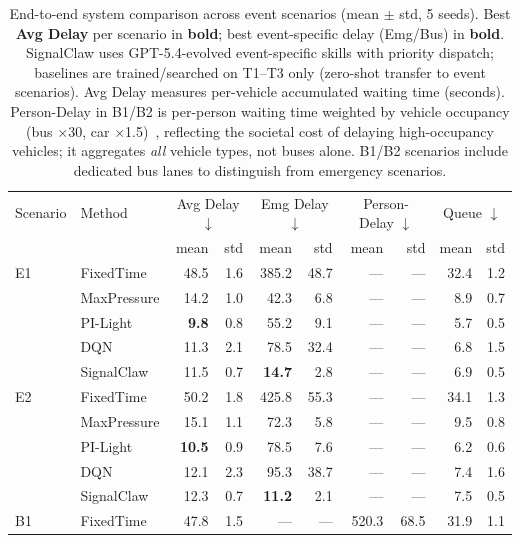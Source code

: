 \begin{table}[t]
\centering
\caption{End-to-end system comparison across event scenarios (mean $\pm$ std, 5 seeds). Best \textbf{Avg Delay} per scenario in \textbf{bold}; best event-specific delay (Emg/Bus) in \textbf{bold}. SignalClaw uses GPT-5.4-evolved event-specific skills with priority dispatch; baselines are trained/searched on T1--T3 only (zero-shot transfer to event scenarios). Avg Delay measures per-vehicle accumulated waiting time (seconds). Person-Delay in B1/B2 is per-person waiting time weighted by vehicle occupancy (bus $\times$30, car $\times$1.5)~\citep{christofa2013tsp}, reflecting the societal cost of delaying high-occupancy vehicles; it aggregates \emph{all} vehicle types, not buses alone. B1/B2 scenarios include dedicated bus lanes to distinguish from emergency scenarios.}
\label{tab:event_results}
\footnotesize
\setlength{\tabcolsep}{3.5pt}
\begin{tabular}{ll|rr|rr|rr|rr}
\toprule
Scenario & Method & \multicolumn{2}{c|}{Avg Delay $\downarrow$} & \multicolumn{2}{c|}{Emg Delay $\downarrow$} & \multicolumn{2}{c|}{Person-Delay $\downarrow$} & \multicolumn{2}{c}{Queue $\downarrow$} \\
& & mean & std & mean & std & mean & std & mean & std \\
\midrule
    E1 & FixedTime & 48.5 & 1.6 & 385.2 & 48.7 & --- & --- & 32.4 & 1.2 \\
     & MaxPressure & 14.2 & 1.0 & 42.3 & 6.8 & --- & --- & 8.9 & 0.7 \\
     & PI-Light & \textbf{9.8} & 0.8 & 55.2 & 9.1 & --- & --- & 5.7 & 0.5 \\
     & DQN & 11.3 & 2.1 & 78.5 & 32.4 & --- & --- & 6.8 & 1.5 \\
     & SignalClaw & 11.5 & 0.7 & \textbf{14.7} & 2.8 & --- & --- & 6.9 & 0.5 \\
\midrule
    E2 & FixedTime & 50.2 & 1.8 & 425.8 & 55.3 & --- & --- & 34.1 & 1.3 \\
     & MaxPressure & 15.1 & 1.1 & 72.3 & 5.8 & --- & --- & 9.5 & 0.8 \\
     & PI-Light & \textbf{10.5} & 0.9 & 78.5 & 7.6 & --- & --- & 6.2 & 0.6 \\
     & DQN & 12.1 & 2.3 & 95.3 & 38.7 & --- & --- & 7.4 & 1.6 \\
     & SignalClaw & 12.3 & 0.7 & \textbf{11.2} & 2.1 & --- & --- & 7.5 & 0.5 \\
\midrule
    B1 & FixedTime & 47.8 & 1.5 & --- & --- & 520.3 & 68.5 & 31.9 & 1.1 \\

\end{tabular}
\end{table}
